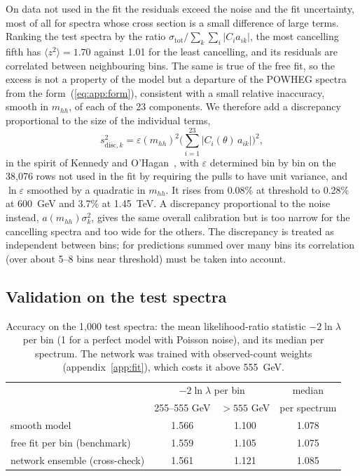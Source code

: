 On data not used in the fit the residuals exceed the noise and the fit uncertainty, most of all for
spectra whose cross section is a small difference of large terms. Ranking the test spectra by the
ratio $\sigma_\text{tot}/\sum_k\sum_i|C_ia_{ik}|$, the most cancelling fifth has
$\langle z^2\rangle = 1.70$ against 1.01 for the least cancelling, and its residuals are correlated
between neighbouring bins. The same is true of the free fit, so the excess is not a property of
the model but a departure of the POWHEG spectra from the form~(\ref{eq:app:form}), consistent with a
small relative inaccuracy, smooth in $m_{hh}$, of each of the 23 components. %
We therefore add a discrepancy proportional to the size of the individual terms,
\begin{equation}
  s_{\text{disc},k}^2 = \varepsilon(m_{hh})^2\Big(\sum_{i=1}^{23}|C_i(\theta)\,a_{ik}|\Big)^2 ,
  \label{eq:app:disc}
\end{equation}
in the spirit of Kennedy and O'Hagan~\cite{Kennedy:2001}, with $\varepsilon$ determined bin by bin on
the 38,076 rows not used in the fit by requiring the pulls to have unit variance, and $\ln\varepsilon$
smoothed by a quadratic in $m_{hh}$. It rises from 0.08\% at threshold to 0.28\% at 600~GeV and
3.7\% at 1.45~TeV. A discrepancy proportional to the noise instead, $a(m_{hh})\sigma_k^2$, gives the same
overall calibration but is too narrow for the cancelling spectra and too wide for the others. The
discrepancy is treated as independent between bins; for predictions summed over many bins its
correlation (over about 5--8 bins near threshold) must be taken into account.

\subsection{Validation on the test spectra}
\label{app:validation}

\begin{table}[t]
\centering
\small
\begin{tabular}{lccc}
\toprule
 & \multicolumn{2}{c}{$-2\ln\lambda$ per bin} & median \\
 & 255--555 GeV & $>555$ GeV & per spectrum \\
\midrule
smooth model                            & 1.566 & 1.100 & 1.078 \\
free fit per bin (benchmark)            & 1.559 & 1.105 & 1.075 \\
network ensemble (cross-check)          & 1.561 & 1.121 & 1.085 \\
\bottomrule
\end{tabular}
\caption{Accuracy on the 1,000 test spectra: the mean likelihood-ratio statistic $-2\ln\lambda$ per bin
(1 for a perfect model with Poisson noise), and its median per spectrum. The network was trained with
observed-count weights (appendix~\ref{app:fit}), which costs it above 555~GeV.}
\label{tab:app:accuracy}
\end{table}

